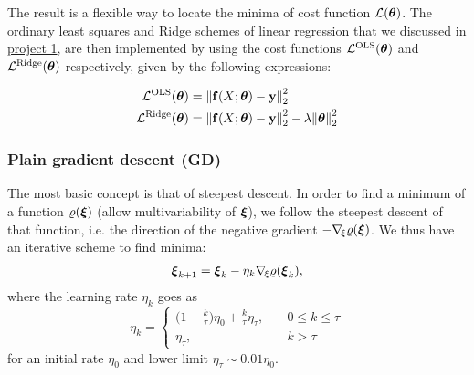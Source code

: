     The result is a flexible way to locate the minima of  cost function $\mathcal{L}(\boldsymbol{\theta})$. The ordinary least squares and Ridge schemes of linear regression that we discussed in \href{https://github.com/Johanmkr/FYS-STK4155colab/tree/main/project1}{project 1}, are then implemented by using the cost functions $\mathcal{L}^\mathrm{OLS}(\boldsymbol{\theta})$ and $\mathcal{L}^\mathrm{Ridge}(\boldsymbol{\theta})$ respectively, given by the following expressions:


    \begin{subequations}\label{eq:linear_regression_cost_functions}
        \begin{align}
            \mathcal{L}^\mathrm{OLS}(\boldsymbol{\theta}) &=  \norm{\mathbf{f}(X; \boldsymbol{\theta} ) - \mathbf{y}}_2^2 \label{eq:ols_cost_function}\\
            \mathcal{L}^\mathrm{Ridge}(\boldsymbol{\theta})&=\norm{\mathbf{f}(X; \boldsymbol{\theta} ) - \mathbf{y}}_2^2  -  \lambda\norm{\boldsymbol{\theta}}_2^2 \label{eq:ridge_cost_function}
        \end{align}
    \end{subequations}

 
    \subsubsection{Plain gradient descent (GD)}\label{sec:plain_gradient_descent}
        The most basic concept is that of steepest descent. In order to find a minimum of a function $\varrho(\boldsymbol{\xi})$ (allow multivariability of $\boldsymbol{\xi}$), we follow the steepest descent of that function, i.e. the direction of the negative gradient $-\nabla_{\!\xi} \varrho(\boldsymbol{\xi})$. We thus have an iterative scheme to find minima:
        \begin{align}\label{eq:steepest_descent}
            \boldsymbol{\xi}_{k+1} = \boldsymbol{\xi}_k - \eta_k\nabla_{\!\xi} \varrho(\boldsymbol{\xi}_k),
        \end{align}
        where the learning rate $\eta_k$ goes as
        \begin{equation}\label{eq:learning_schedule}
            \eta_k = \begin{cases}
                \big(1-\frac{k}{\tau}\big)\eta_0 + \frac{k}{\tau}\eta_\tau,\quad & 0 \leq k \leq \tau \\
                \eta_\tau, & k>\tau
            \end{cases}
        \end{equation}
        for an initial rate $\eta_0$ and lower limit $\eta_\tau \sim 0.01 \eta_0$.

